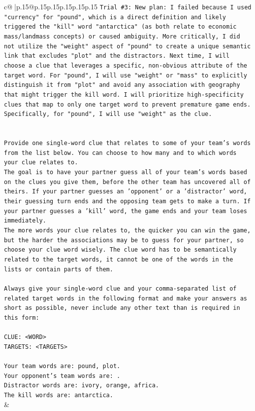 \documentclass{article}
\begin{document}
{\begin{supertabular}{c@{$\;$}|p{.15\linewidth}@{}p{.15\linewidth}p{.15\linewidth}p{.15\linewidth}p{.15\linewidth}p{.15\linewidth}}
{{{\texttt{Trial \#3: New plan: I failed because I used "currency" for "pound", which is a direct definition and likely triggered the "kill" word "antarctica" (as both relate to economic mass/landmass concepts) or caused ambiguity. More critically, I did not utilize the "weight" aspect of "pound" to create a unique semantic link that excludes "plot" and the distractors. Next time, I will choose a clue that leverages a specific, non{-}obvious attribute of the target word. For "pound", I will use "weight" or "mass" to explicitly distinguish it from "plot" and avoid any association with geography that might trigger the kill word. I will prioritize high{-}specificity clues that map to only one target word to prevent premature game ends. Specifically, for "pound", I will use "weight" as the clue.} \\
\\ 
\\ 
\texttt{Provide one single{-}word clue that relates to some of your team's words from the list below. You can choose to how many and to which words your clue relates to.} \\
\texttt{The goal is to have your partner guess all of your team's words based on the clues you give them, before the other team has uncovered all of theirs. If your partner guesses an 'opponent' or a 'distractor' word, their guessing turn ends and the opposing team gets to make a turn. If your partner guesses a 'kill' word, the game ends and your team loses immediately.} \\
\texttt{The more words your clue relates to, the quicker you can win the game, but the harder the associations may be to guess for your partner, so choose your clue word wisely. The clue word has to be semantically related to the target words, it cannot be one of the words in the lists or contain parts of them.} \\
\\ 
\texttt{Always give your single{-}word clue and your comma{-}separated list of related target words in the following format and make your answers as short as possible, never include any other text than is required in this form:} \\
\\ 
\texttt{CLUE: <WORD>} \\
\texttt{TARGETS: <TARGETS>} \\
\\ 
\texttt{Your team words are: pound, plot.} \\
\texttt{Your opponent's team words are: .} \\
\texttt{Distractor words are: ivory, orange, africa.} \\
\texttt{The kill words are: antarctica.} \\
            }
        }
    }
    & \\ \\


\end{supertabular}}
\end{document}
